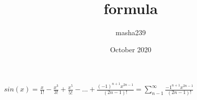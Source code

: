 \documentclass{article}
\title{formula}
\author{masha239}
\date{October 2020}
\begin{document}
$sin(x) = \frac{x}{1!} - \frac{x^3}{3!} + \frac{x^5}{5!} - ... + \frac{(-1)^{n+1}x^{2n-1}}{(2n-1)!} = \sum_{n-1}^{\infty}\frac{-1^{n+1}x^{2n-1}}{(2n-1)!}$
\end{document}

